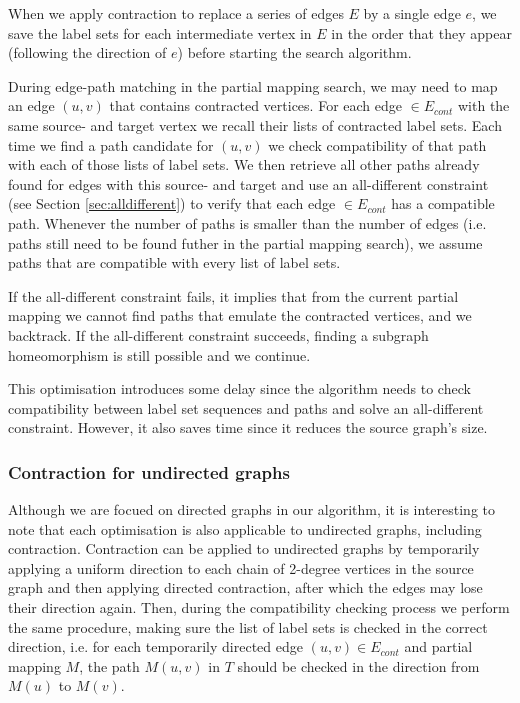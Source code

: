 When we apply contraction to replace a series of edges $E$ by a single edge $e$, we save the label sets for each intermediate vertex in $E$ in the order that they appear (following the direction of $e$) before starting the search algorithm. 

During edge-path matching in the partial mapping search, we may need to map an edge $(u, v)$ that contains contracted vertices. For each edge $\in E_{cont}$ with the same source- and target vertex we recall their lists of contracted label sets. Each time we find a path candidate for $(u, v)$ we check compatibility of that path with each of those lists of label sets. We then retrieve all other paths already found for edges with this source- and target and use an all-different constraint (see Section \ref{sec:alldifferent}) to verify that each edge $\in E_{cont}$ has a compatible path. Whenever the number of paths is smaller than the number of edges (i.e. paths still need to be found futher in the partial mapping search), we assume paths that are compatible with every list of label sets.

If the all-different constraint fails, it implies that from the current partial mapping we cannot find paths that emulate the contracted vertices, and we backtrack. If the all-different constraint succeeds, finding a subgraph homeomorphism is still possible and we continue.

This optimisation introduces some delay since the algorithm needs to check compatibility between label set sequences and paths and solve an all-different constraint. However, it also saves time since it reduces the source graph's size.

\subsubsection{Contraction for undirected graphs}
Although we are focued on directed graphs in our algorithm, it is interesting to note that each optimisation is also applicable to undirected graphs, including contraction. Contraction can be applied to undirected graphs by temporarily applying a uniform direction to each chain of 2-degree vertices in the source graph and then applying directed contraction, after which the edges may lose their direction again. Then, during the compatibility checking process we perform the same procedure, making sure the list of label sets is checked in the correct direction, i.e. for each temporarily directed edge $(u, v) \in E_{cont}$ and partial mapping $M$, the path $M(u, v)$ in $T$ should be checked in the direction from $M(u)$ to $M(v)$.



